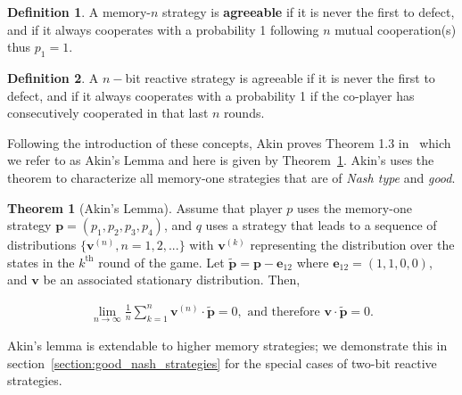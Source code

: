 \documentclass{article}
\theoremstyle{definition}
\newtheorem{definition}{Definition}[section]
\newtheorem{theorem}{Theorem}[section]
\begin{document}
\begin{definition}\label{definition:memn_agreeable}
  A memory-\(n\) strategy is \textbf{agreeable} if it is never the first to defect,
  and if it always cooperates with a probability 1 following \(n\) mutual cooperation(s) thus
  \(p_1=1\).
\end{definition}

\begin{definition}\label{definition:nbit_agreeable} A \(n-\)bit reactive strategy is
agreeable if it is never the first to defect,
and if it always cooperates with a probability 1 if the co-player has consecutively cooperated in that last \(n\) rounds.
\end{definition}

Following the introduction of these concepts, Akin proves Theorem 1.3
in~\citep{akin:EGADS:2016} which we refer to as Akin's Lemma and here is given
by Theorem~\ref{theorem:akin}. Akin's uses the theorem to characterize all memory-one
strategies that are of \textit{Nash type} and \textit{good}.

\begin{theorem}[Akin's Lemma]\label{theorem:akin}
  Assume that player \(p\) uses the memory-one strategy \(\mathbf{p}=(p_1, p_2, p_3, p_4)\),
  and \(q\) uses a strategy that leads to a sequence
  of distributions \(\{\mathbf{v}^{(n)}, n = 1, 2, ...\}\) with \(\mathbf{v}^{(k)}\) representing the
  distribution over the states in the \(k^{\text{th}}\) round of the game. Let  \(\mathbf{\tilde{p}} = \mathbf{p} - \mathbf{e}_{12}\) where
  \(\mathbf{e}_{12} = (1, 1, 0, 0)\), and
  \(\mathbf{v}\) be an associated stationary distribution. Then,

  \begin{align}
    \lim_{n \rightarrow \infty} \frac{1}{n} \sum_{k=1}^{n} \mathbf{v}^{(n)} \cdot \mathbf{\tilde{p}} = 0, \text{ and therefore } \mathbf{v} \cdot \mathbf{\tilde{p}} = 0.
  \end{align}
\end{theorem}

Akin's lemma is extendable to higher memory strategies; we demonstrate this in section~\ref{section:good_nash_strategies}
for the special cases of two-bit reactive strategies.
\end{document}
